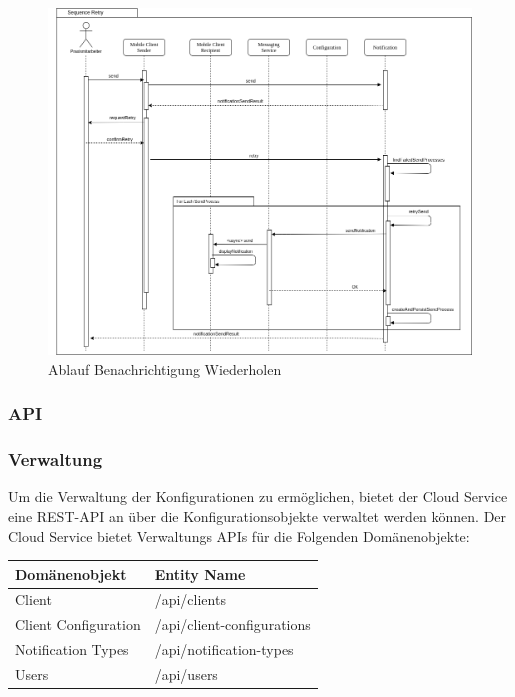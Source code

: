 \begin{figure}[h]
    \centering
    \begin{minipage}[b]{0.9\textwidth}
        \includegraphics[width=\textwidth]{graphics/Sequence_Notification_Retry}
        \caption{Ablauf Benachrichtigung Wiederholen}
    \end{minipage}
\end{figure}


\clearpage

\subsubsection{API}

\subsubsection*{Verwaltung}

Um die Verwaltung der Konfigurationen zu ermöglichen, bietet der Cloud Service eine REST-API an über die Konfigurationsobjekte verwaltet werden können.
Der Cloud Service bietet Verwaltungs APIs für die Folgenden Domänenobjekte:

\begin{table}[h]
    \centering
    \begin{tabular}{|l|p{13cm}|}
        \hline
        \textbf{Domänenobjekt} & \textbf{Entity Name} \\
        \hline
        Client         & /api/clients \\
        \hline
        Client Configuration         & /api/client-configurations \\
        \hline
        Notification Types         & /api/notification-types \\
        \hline
        Users         & /api/users \\
        \hline
    \end{tabular}\label{tab:adminapimethods}
\end{table}

